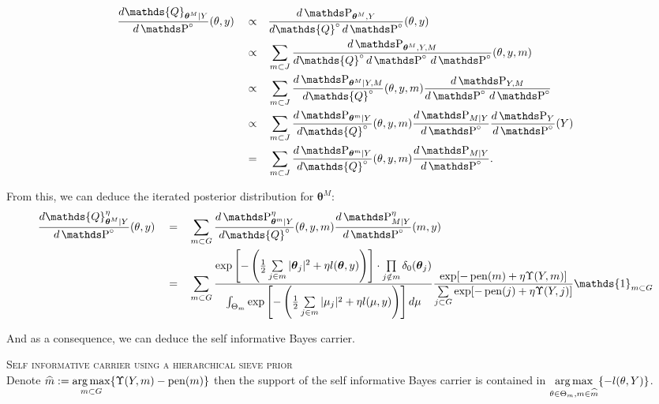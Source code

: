 \begin{alignat*}{3}
&\frac{d\mathds{Q}_{\boldsymbol{\theta}^{M} \vert Y}}{d\P^{\circ}}(\theta, y) && \propto && \frac{d\P_{\boldsymbol{\theta}^{M}, Y}}{d\mathds{Q}^{\circ} \, d\P^{\circ}}(\theta, y)\\
& &&\propto&& \sum\limits_{m \subset J} \frac{d\P_{\boldsymbol{\theta}^{M}, Y, M}}{d\mathds{Q}^{\circ} \, d\P^{\circ} \, d\P^{\circ}}(\theta, y, m)\\
& &&\propto&& \sum\limits_{m \subset J} \frac{d\P_{\boldsymbol{\theta}^{M} \vert Y, M}}{d\mathds{Q}^{\circ}}(\theta, y, m) \frac{d\P_{Y, M}}{d\P^{\circ} \, d\P^{\circ}}\\
& &&\propto&& \sum\limits_{m \subset J} \frac{d\P_{\boldsymbol{\theta}^{m} \vert Y}}{d\mathds{Q}^{\circ}}(\theta, y, m) \frac{d\P_{M \vert Y}}{d\P^{\circ}} \frac{d\P_{Y}}{d\P^{\circ}}(Y)\\
& &&=&& \sum\limits_{m \subset J} \frac{d\P_{\boldsymbol{\theta}^{m} \vert Y}}{d\mathds{Q}^{\circ}}(\theta, y, m) \frac{d\P_{M \vert Y}}{d\P^{\circ}}.
\end{alignat*}

From this, we can deduce the iterated posterior distribution for $\boldsymbol{\theta}^{M}$:
\begin{alignat*}{3}
& \frac{d\mathds{Q}_{\boldsymbol{\theta}^{M} \vert Y}^{\eta}}{d\P^{\circ}}(\theta, y) && = && \sum\limits_{m \subset G} \frac{d\P_{\boldsymbol{\theta}^{m} \vert Y}^{\eta}}{d\mathds{Q}^{\circ}}(\theta, y, m) \frac{d\P_{M \vert Y}^{\eta}}{d\P^{\circ}}(m, y)\\
& && = && \sum\limits_{m \subset G} \frac{\exp\left[-\left(\frac{1}{2}\sum\limits_{j \in m} \vert \boldsymbol{\theta}_{j} \vert^{2} + \eta l(\boldsymbol{\theta}, y)\right)\right] \cdot \prod\limits_{j \notin m} \delta_{0}(\boldsymbol{\theta}_{j})}{\int_{\Theta_{m}} \exp\left[-\left(\frac{1}{2}\sum\limits_{j \in m} \vert \mu_{j} \vert^{2} + \eta l(\mu, y)\right)\right] d\mu} \frac{\exp[-\pen(m) + \eta \Upsilon(Y, m)]}{\sum\limits_{j \subset G}\exp[- \pen(j) + \eta \Upsilon(Y, j)]} \mathds{1}_{m \subset G}\\
\end{alignat*}

And as a consequence, we can deduce the self informative Bayes carrier.

\begin{thm}{\textsc{Self informative carrier using a hierarchical sieve prior}\\}
Denote $\widehat{m} := \operatorname*{arg\,max}\limits_{m \subset G} \{\Upsilon(Y, m) - \operatorname{pen}(m)\}$ then the support of the self informative Bayes carrier is contained in $\operatorname*{arg\,max}\limits_{\theta \in \Theta_{m}, m \in \widehat{m}}\{-l(\theta, Y)\}$.
\end{thm}

